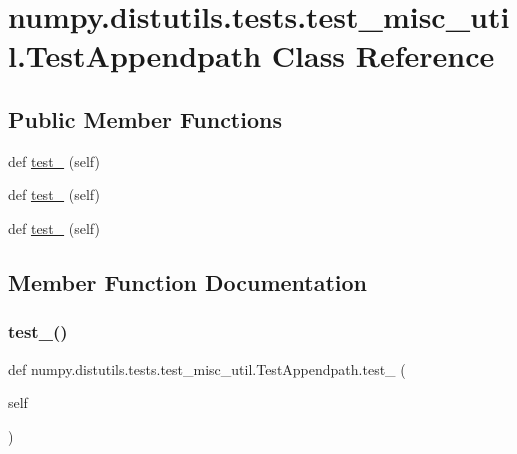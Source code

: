 \hypertarget{classnumpy_1_1distutils_1_1tests_1_1test__misc__util_1_1TestAppendpath}{}\section{numpy.\+distutils.\+tests.\+test\+\_\+misc\+\_\+util.\+Test\+Appendpath Class Reference}
\label{classnumpy_1_1distutils_1_1tests_1_1test__misc__util_1_1TestAppendpath}
\subsection*{Public Member Functions}
\begin{DoxyCompactItemize}
\item 
def \hyperlink{classnumpy_1_1distutils_1_1tests_1_1test__misc__util_1_1TestAppendpath_a7415dd7ff6abc7da3b3e892d88cb70f4}{test\+\_} (self)
\item 
def \hyperlink{classnumpy_1_1distutils_1_1tests_1_1test__misc__util_1_1TestAppendpath_a8463ca0234250d4d3f9214565f04baf7}{test\+\_} (self)
\item 
def \hyperlink{classnumpy_1_1distutils_1_1tests_1_1test__misc__util_1_1TestAppendpath_a5f9b23162f9d282d24465dfceca54e63}{test\+\_} (self)
\end{DoxyCompactItemize}


\subsection{Member Function Documentation}
\mbox{\label{classnumpy_1_1distutils_1_1tests_1_1test__misc__util_1_1TestAppendpath_a7415dd7ff6abc7da3b3e892d88cb70f4}} 
\subsubsection{\texorpdfstring{test\+\_()}{test\_1()}}
{\footnotesize\ttfamily def numpy.\+distutils.\+tests.\+test\+\_\+misc\+\_\+util.\+Test\+Appendpath.\+test\+\_ (\begin{DoxyParamCaption}\item[{}]{self }\end{DoxyParamCaption})}

